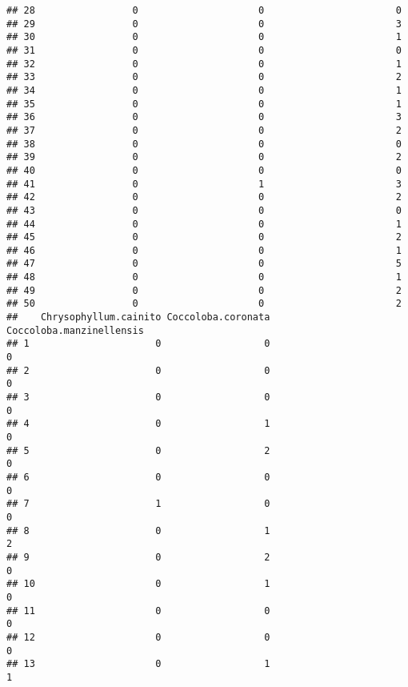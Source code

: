 \documentclass[
]{article}
\begin{document}
\begin{verbatim}
## 28                 0                     0                       0
## 29                 0                     0                       3
## 30                 0                     0                       1
## 31                 0                     0                       0
## 32                 0                     0                       1
## 33                 0                     0                       2
## 34                 0                     0                       1
## 35                 0                     0                       1
## 36                 0                     0                       3
## 37                 0                     0                       2
## 38                 0                     0                       0
## 39                 0                     0                       2
## 40                 0                     0                       0
## 41                 0                     1                       3
## 42                 0                     0                       2
## 43                 0                     0                       0
## 44                 0                     0                       1
## 45                 0                     0                       2
## 46                 0                     0                       1
## 47                 0                     0                       5
## 48                 0                     0                       1
## 49                 0                     0                       2
## 50                 0                     0                       2
##    Chrysophyllum.cainito Coccoloba.coronata Coccoloba.manzinellensis
## 1                      0                  0                        0
## 2                      0                  0                        0
## 3                      0                  0                        0
## 4                      0                  1                        0
## 5                      0                  2                        0
## 6                      0                  0                        0
## 7                      1                  0                        0
## 8                      0                  1                        2
## 9                      0                  2                        0
## 10                     0                  1                        0
## 11                     0                  0                        0
## 12                     0                  0                        0
## 13                     0                  1                        1

\end{verbatim}
\end{document}
